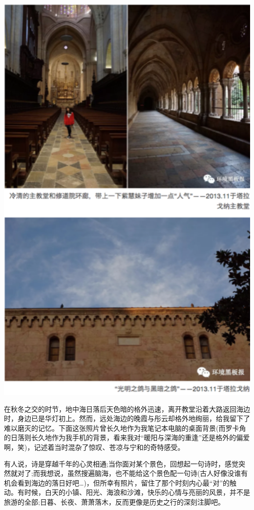 \documentclass[]{book}
\begin{document}
\includegraphics[width=5.25in]{images/xt39}

在秋冬之交的时节，地中海日落后天色暗的格外迅速，离开教堂沿着大路返回海边时，身边已是华灯初上。然而，远处海边的晚霞与彤云却格外地绚丽，给我留下了难以磨灭的记忆。下面这张照片曾长久地作为我笔记本电脑的桌面背景(而罗卡角的日落则长久地作为我手机的背景，看来我对``暖阳与深海的重逢''还是格外的偏爱啊，笑)，记述着当时混杂了惊叹、苍凉与宁和的奇特感受。

有人说，诗是穿越千年的心灵相通;当你面对某个景色，回想起一句诗时，感觉突然就对了;而我想说，虽然搜遍脑海，也不能给这个景色配一句诗(古人好像没谁有机会看到海边的落日好吧\ldots{})，但所幸有照片，留住了那个时刻内心最``对''的触动。有时候，白天的小镇、阳光、海浪和沙滩，快乐的心情与亮丽的风景，并不是旅游的全部;日暮、长夜、萧萧落木，反而更像是历史之行的深刻注脚吧。
\end{document}
